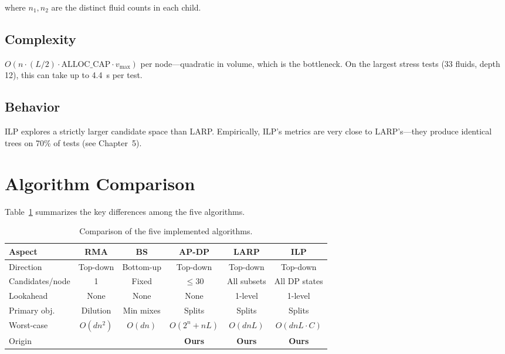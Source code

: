 where $n_1, n_2$ are the distinct fluid counts in each child.

\subsection{Complexity}

$O(n \cdot (L/2) \cdot \text{ALLOC\_CAP} \cdot v_{\max})$ per node---quadratic in volume, which is the bottleneck. On the largest stress tests (33 fluids, depth 12), this can take up to 4.4~s per test.

\subsection{Behavior}

ILP explores a strictly larger candidate space than LARP. Empirically, ILP's metrics are very close to LARP's---they produce identical trees on 70\% of tests (see Chapter~5).

\section{Algorithm Comparison}

Table~\ref{tab:algo_comparison} summarizes the key differences among the five algorithms.

\begin{table}[H]
\centering
\caption{Comparison of the five implemented algorithms.}
\label{tab:algo_comparison}
\begin{tabular}{|l|c|c|c|c|c|}
\hline
\textbf{Aspect} & \textbf{RMA} & \textbf{BS} & \textbf{AP-DP} & \textbf{LARP} & \textbf{ILP} \\
\hline
Direction & Top-down & Bottom-up & Top-down & Top-down & Top-down \\
\hline
Candidates/node & 1 & Fixed & $\leq 30$ & All subsets & All DP states \\
\hline
Lookahead & None & None & None & 1-level & 1-level \\
\hline
Primary obj. & Dilution & Min mixes & Splits & Splits & Splits \\
\hline
Worst-case & $O(d n^2)$ & $O(dn)$ & $O(2^n + nL)$ & $O(dnL)$ & $O(dnL \cdot C)$ \\
\hline
Origin & \cite{roy2010layout} & \cite{thies_bs} & \textbf{Ours} & \textbf{Ours} & \textbf{Ours} \\
\hline
\end{tabular}
\end{table}

